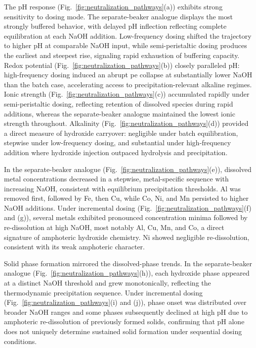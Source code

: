 \documentclass[final,2p,times]{elsarticle}
\begin{document}
The pH response (Fig.~\ref{fig:neutralization_pathways}(a)) exhibits strong sensitivity to dosing mode. The separate-beaker analogue displays the most strongly buffered behavior, with delayed pH inflection reflecting complete equilibration at each NaOH addition. Low-frequency dosing shifted the trajectory to higher pH at comparable NaOH input, while semi-peristaltic dosing produces the earliest and steepest rise, signaling rapid exhaustion of buffering capacity. Redox potential (Fig.~\ref{fig:neutralization_pathways}(b)) closely paralleled pH: high-frequency dosing induced an abrupt pe collapse at substantially lower NaOH than the batch case, accelerating access to precipitation-relevant alkaline regimes. Ionic strength (Fig.~\ref{fig:neutralization_pathways}(c)) accumulated rapidly under semi-peristaltic dosing, reflecting retention of dissolved species during rapid additions, whereas the separate-beaker analogue maintained the lowest ionic strength throughout. Alkalinity (Fig.~\ref{fig:neutralization_pathways}(d)) provided a direct measure of hydroxide carryover: negligible under batch equilibration, stepwise under low-frequency dosing, and substantial under high-frequency addition where hydroxide injection outpaced hydrolysis and precipitation.

In the separate-beaker analogue (Fig.~\ref{fig:neutralization_pathways}(e)), dissolved metal concentrations decreased in a stepwise, metal-specific sequence with increasing NaOH, consistent with equilibrium precipitation thresholds. Al was removed first, followed by Fe, then Cu, while Co, Ni, and Mn persisted to higher NaOH additions. Under incremental dosing (Fig.~\ref{fig:neutralization_pathways}(f) and (g)), several metals exhibited pronounced concentration minima followed by re-dissolution at high NaOH, most notably Al, Cu, Mn, and Co, a direct signature of amphoteric hydroxide chemistry. Ni showed negligible re-dissolution, consistent with its weak amphoteric character.

Solid phase formation mirrored the dissolved-phase trends. In the separate-beaker analogue (Fig.~\ref{fig:neutralization_pathways}(h)), each hydroxide phase appeared at a distinct NaOH threshold and grew monotonically, reflecting the thermodynamic precipitation sequence. Under incremental dosing (Fig.~\ref{fig:neutralization_pathways}(i) and (j)), phase onset was distributed over broader NaOH ranges and some phases subsequently declined at high pH due to amphoteric re-dissolution of previously formed solids, confirming that pH alone does not uniquely determine sustained solid formation under sequential dosing conditions.
\end{document}

